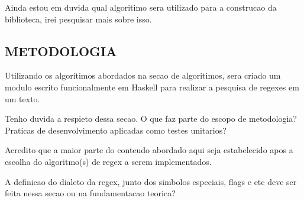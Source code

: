 Ainda estou em duvida qual algoritimo sera utilizado para a construcao da biblioteca, irei pesquisar mais sobre isso.

\subsection{METODOLOGIA}

Utilizando os algoritimos abordados na secao de algoritimos, sera criado um modulo escrito funcionalmente em Haskell para realizar a pesquisa de regexes em um texto.

Tenho duvida a respieto dessa secao. O que faz parte do escopo de metodologia?
Praticas de desenvolvimento aplicadas como testes unitarios?

Acredito que a maior parte do conteudo abordado aqui seja estabelecido apos a escolha do algoritmo(s) de regex a serem implementados.

A definicao do dialeto da regex, junto dos simbolos especiais, flags e etc deve ser feita nessa secao ou na fundamentacao teorica?


